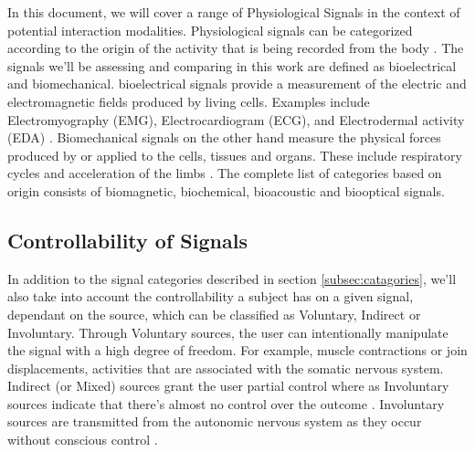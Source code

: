 In this document, we will cover a range of Physiological Signals in the context of potential interaction modalities. Physiological signals can be categorized according to the origin of the activity that is being recorded from the body \cite{enderle_introduction_2012}. The signals we'll be assessing and comparing in this work are defined as bioelectrical and biomechanical. bioelectrical signals provide a measurement of the electric and electromagnetic fields produced by living cells. Examples include Electromyography (EMG), Electrocardiogram (ECG), and Electrodermal activity (EDA) \cite{malmivuo_bioelectromagnetismprinciples_1995}. Biomechanical signals on the other hand measure the physical forces produced by or applied to the cells, tissues and organs. These include respiratory cycles and acceleration of the limbs \cite{guerreiro_bitalino_2013, pacelli_sensing_2006}. The complete list of categories based on origin consists of biomagnetic, biochemical, bioacoustic and biooptical signals.   

\subsection{Controllability of Signals}

In addition to the signal categories described in section \ref{subsec:catagories}, we'll also take into account the controllability a subject has on a given signal, dependant on the source, which can be classified as Voluntary, Indirect or Involuntary. Through Voluntary sources, the user can intentionally manipulate the signal with a high degree of freedom. For example, muscle contractions or join displacements, activities that are associated with the somatic nervous system. Indirect (or Mixed) sources grant the user partial control where as Involuntary sources indicate that there's almost no control over the outcome \cite{da_silva_biosignal_2017}. Involuntary sources are transmitted from the autonomic nervous system as they occur without conscious control \cite{lenman_human_1975}.




